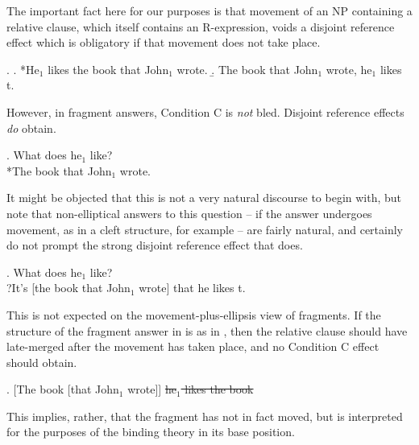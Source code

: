 \documentclass[11pt,letterpaper]{article}
\newcommand{\el}[1]{\sout{#1}}
\begin{document}
The important fact here for our purposes is that movement of an NP containing a relative clause, which itself contains an R-expression, voids a disjoint reference effect which is obligatory if that movement does not take place.

\ex. 	\a. *He$_1$ likes the book that John$_1$ wrote.
	\b. The book that John$_1$ wrote, he$_1$ likes t.
	
However, in fragment answers, Condition C is \emph{not} bled. Disjoint reference effects \emph{do} obtain.

\ex. 	What does he$_1$ like?\\
	{}*The book that John$_1$ wrote.
	
It might be objected that this is not a very natural discourse to begin with, but note that non-elliptical answers to this question -- if the answer undergoes movement, as in a cleft structure, for example -- are fairly natural, and certainly do not prompt the strong disjoint reference effect that \Last does.

\ex. 	What does he$_1$ like?\\
	{}?It's [the book that John$_1$ wrote] that he likes t.
	
This is not expected on the movement-plus-ellipsis view of fragments. If the structure of the fragment answer in \LLast is as in \Next, then the relative clause should have late-merged after the movement has taken place, and no Condition C effect should obtain.

\ex. 	[The book [that John$_1$ wrote]] \el{he$_1$ likes the book}

This implies, rather, that the fragment has not in fact moved, but is interpreted for the purposes of the binding theory in its base position.


% 
% 	
% 
\end{document}
